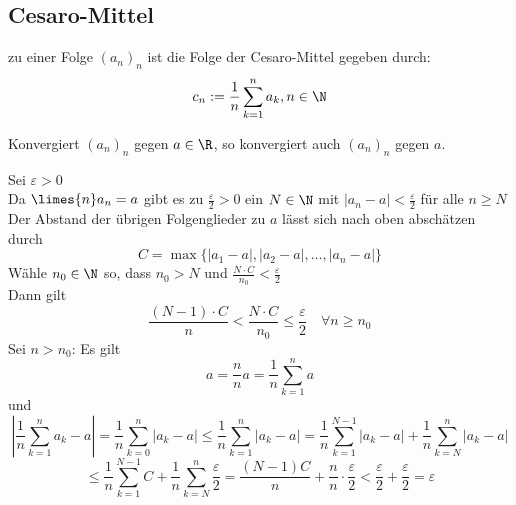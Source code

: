 \documentclass[12pt,a4paper,titlepage,draft]{article}
\begin{document}
	\subsection{Cesaro-Mittel}
	zu einer Folge \((a_n)_n\) ist die Folge der Cesaro-Mittel gegeben durch:
	\[c_n := \frac{1}{n} \sum_{k=1}^{n} a_k, n\in \N\]
	\begin{beh}
		Konvergiert \((a_n)_n\) gegen \(a \in \R\), so konvergiert auch \((a_n)_n\) gegen \(a\).
	\end{beh}
	\begin{bew}
		Sei \(\varepsilon > 0\)\\
		Da \(\limes{n} a_n = a\) gibt es zu \(\frac{\varepsilon}{2} > 0\) ein \(N \in \N\) mit \(|a_n -a| < \frac{\varepsilon}{2}\) für alle \(n \geq N\)\\
		Der Abstand der übrigen Folgenglieder zu \(a\) lässt sich nach oben abschätzen durch
		\[C = \max\{|a_1-a|,|a_2-a|, \dots, |a_n-a|\}\]
		Wähle \(n_0 \in \N\) so, dass \(n_0 > N\) und \(\frac{N \cdot C}{n_0} < \frac{\varepsilon}{2}\)\\
		Dann gilt
		\[\frac{(N-1) \cdot C}{n} < \frac{N \cdot C}{n_0} \leq \frac{\varepsilon}{2} \quad \forall n \geq n_0\]
		Sei \(n > n_0\): Es gilt
		\[a = \frac{n}{n}a = \frac{1}{n} \sum_{k=1}^{n} a\]
		und
		\[\left|\frac{1}{n} \sum_{k=1}^{n} a_k-a\right| = \frac{1}{n} \sum_{k=0}^{n} |a_k-a| \leq \frac{1}{n} \sum_{k=1}^{n} |a_k-a| = \frac{1}{n} \sum_{k=1}^{N-1} |a_k-a| + \frac{1}{n} \sum_{k=N}^{n} |a_k-a|\]
		\[\leq \frac{1}{n} \sum_{k=1}^{N-1} C + \frac{1}{n} \sum_{k=N}^{n} \frac{\varepsilon}{2} = \frac{(N-1)C}{n} + \frac{n}{n} \cdot \frac{\varepsilon}{2} < \frac{\varepsilon}{2} + \frac{\varepsilon}{2} = \varepsilon \]
	\end{bew}
\end{document}
